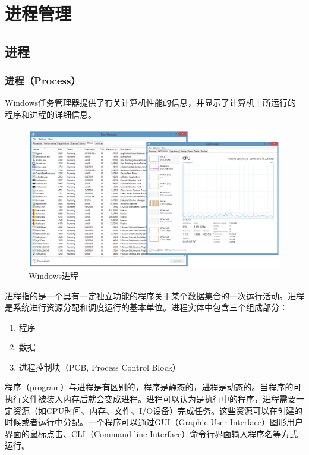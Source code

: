 \chapter{进程管理}

\section{进程}

\subsection{进程（Process）}

Windows任务管理器提供了有关计算机性能的信息，并显示了计算机上所运行的程序和进程的详细信息。

\begin{figure}[H]
    \centering
    \includegraphics[scale=0.6]{img/C2/2-1/1.png}
    \caption{Windows进程}
\end{figure}

进程指的是一个具有一定独立功能的程序关于某个数据集合的一次运行活动。进程是系统进行资源分配和调度运行的基本单位。进程实体中包含三个组成部分：

\begin{enumerate}
    \item 程序
    \item 数据
    \item 进程控制块（PCB, Process Control Block）
\end{enumerate}

程序（program）与进程是有区别的，程序是静态的，进程是动态的。当程序的可执行文件被装入内存后就会变成进程。进程可以认为是执行中的程序，进程需要一定资源（如CPU时间、内存、文件、I/O设备）完成任务。这些资源可以在创建的时候或者运行中分配。一个程序可以通过GUI（Graphic User Interface）图形用户界面的鼠标点击、CLI（Command-line Interface）命令行界面输入程序名等方式运行。

